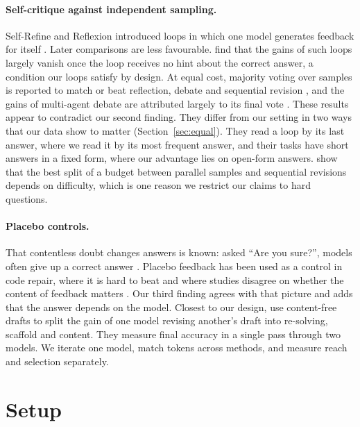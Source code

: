 \documentclass[11pt]{article}
\begin{document}
\paragraph{Self-critique against independent sampling.}
Self-Refine and Reflexion introduced loops in which one model generates feedback for itself \citep{madaan2023selfrefine,shinn2023reflexion}.
Later comparisons are less favourable.
\citet{huang2024cannot} find that the gains of such loops largely vanish once the loop receives no hint about the correct answer, a condition our loops satisfy by design.
At equal cost, majority voting over samples is reported to match or beat reflection, debate and sequential revision \citep{wang2024token,wang2025rethinking,mirzaei2026sample}, and the gains of multi-agent debate are attributed largely to its final vote \citep{du2024debate,smit2024mad,choi2025debate}.
These results appear to contradict our second finding.
They differ from our setting in two ways that our data show to matter (Section~\ref{sec:equal}).
They read a loop by its last answer, where we read it by its most frequent answer, and their tasks have short answers in a fixed form, where our advantage lies on open-form answers.
\citet{snell2024scaling} show that the best split of a budget between parallel samples and sequential revisions depends on difficulty, which is one reason we restrict our claims to hard questions.

\paragraph{Placebo controls.}
That contentless doubt changes answers is known: asked ``Are you sure?'', models often give up a correct answer \citep{laban2024flipflop}.
Placebo feedback has been used as a control in code repair, where it is hard to beat and where studies disagree on whether the content of feedback matters \citep{olausson2024selfrepair,iscan2026falsification,iscan2026form,verma2026blind}.
Our third finding agrees with that picture and adds that the answer depends on the model.
Closest to our design, \citet{ning2026revision} use content-free drafts to split the gain of one model revising another's draft into re-solving, scaffold and content.
They measure final accuracy in a single pass through two models.
We iterate one model, match tokens across methods, and measure reach and selection separately.

\section{Setup}
\label{sec:setup}
\end{document}

